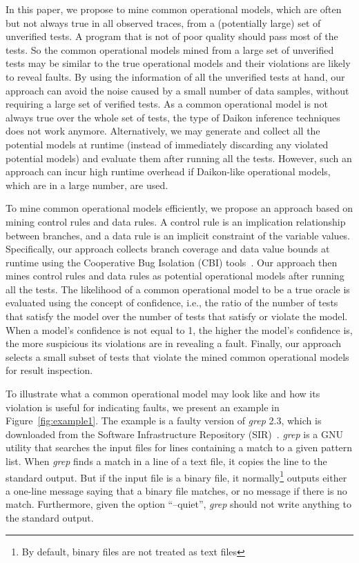 \documentclass{sig-alternate}
\begin{document}
In this paper, we propose to mine common operational models, which
are often but not always true in all observed traces, from a
(potentially large) set of unverified tests. A program that is not
of poor quality should pass most of the tests. So the common
operational models mined from a large set of unverified tests may be
similar to the true operational models and their violations are
likely to reveal faults. By using the information of all the
unverified tests at hand, our approach can avoid the noise caused by
a small number of data samples, without requiring a large set of
verified tests. As a common operational model is not always true
over the whole set of tests, the type of Daikon inference techniques
does not work anymore. Alternatively, we may generate and collect
all the potential models at runtime (instead of immediately
discarding any violated potential models) and evaluate them after
running all the tests. However, such an approach can incur high
runtime overhead if Daikon-like operational models, which are in a
large number, are used.






To mine common operational models efficiently, we propose an
approach based on mining control rules and data rules. A control
rule is an implication relationship between branches, and a data
rule is an implicit constraint of the variable values. Specifically,
our approach collects branch coverage and data value bounds at
runtime using the Cooperative Bug Isolation (CBI)
tools~\cite{Liblit04}. Our approach then mines control rules and
data rules as potential operational models after running all the
tests. The likelihood of a common operational model to be a true
oracle is evaluated using the concept of confidence, i.e., the ratio
of the number of tests that satisfy the model over the number of
tests that satisfy or violate the model. When a model's confidence
is not equal to 1, the higher the model's confidence is, the more
suspicious its violations are in revealing a fault. Finally, our
approach selects a small subset of tests that violate the mined
common operational models for result inspection.


To illustrate what a common operational model may look like and how
its violation is useful for indicating faults, we present an example
in Figure~\ref{fig:example1}. The example is a faulty version of
\emph{grep} 2.3, which is downloaded from the Software
Infrastructure Repository (SIR)~\cite{SIR}. \emph{grep} is a GNU
utility that searches the input files for lines containing a match
to a given pattern list. When \emph{grep} finds a match in a line of
a text file, it copies the line to the standard output. But if the
input file is a binary file, it normally\footnote{By default, binary
files are not treated as text files} outputs either a one-line
message saying that a binary file matches, or no message if there is
no match. Furthermore, given the option ``--quiet'', \emph{grep}
should not write anything to the standard output.
\end{document}
